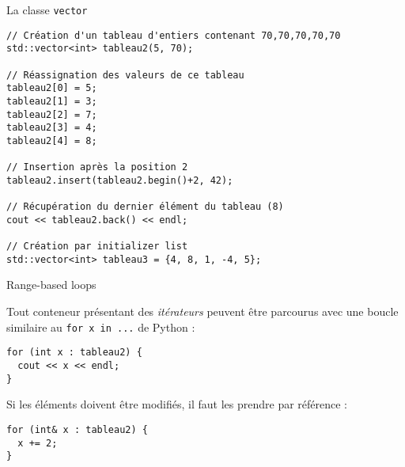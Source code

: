 \documentclass[c]{beamer}
\begin{document}
\begin{frame}[fragile]{La classe \texttt{vector}}

\begin{verbatim}
// Création d'un tableau d'entiers contenant 70,70,70,70,70
std::vector<int> tableau2(5, 70);

// Réassignation des valeurs de ce tableau
tableau2[0] = 5;
tableau2[1] = 3;
tableau2[2] = 7;
tableau2[3] = 4;
tableau2[4] = 8;

// Insertion après la position 2
tableau2.insert(tableau2.begin()+2, 42);

// Récupération du dernier élément du tableau (8)
cout << tableau2.back() << endl;

// Création par initializer list
std::vector<int> tableau3 = {4, 8, 1, -4, 5};

\end{verbatim}

\end{frame}


\begin{frame}[fragile]{Range-based loops}

Tout conteneur présentant des \emph{itérateurs} peuvent être parcourus avec une boucle similaire au \texttt{for x in ...} de Python :

\begin{verbatim}
for (int x : tableau2) {
  cout << x << endl;
}
\end{verbatim}

Si les éléments doivent être modifiés, il faut les prendre par référence :

\begin{verbatim}
for (int& x : tableau2) {
  x += 2;
}
\end{verbatim}

\end{frame}

\end{document}
